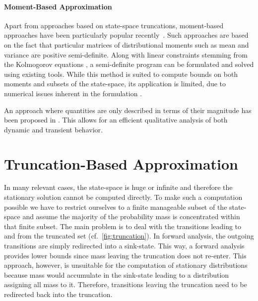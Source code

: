 \paragraph{Moment-Based Approximation}
Apart from approaches based on state-space truncations, moment-based approaches have been particularly popular recently~\parencite{ghusinga2017exact,dowdy2018bounds,kuntz2017rigorous,sakurai2017convex}.
Such approaches are based on the fact that particular matrices of distributional moments such as mean and variance are positive semi-definite.
Along with linear constraints stemming from the Kolmogorov equations \parencite{backenkohler2016generalized}, a semi-definite program can be formulated and solved using existing tools.
While this method is suited to compute bounds on both moments and subsets of the state-space, its application is limited, due to numerical issues inherent in the formulation \parencite{dowdy2018bounds}.

An approach where quantities are only described in terms of their magnitude has been proposed in \citet{ceska2019semi}. This allows for an efficient qualitative analysis of both dynamic and transient behavior.




\section{Truncation-Based Approximation}\label{sec:statagg:fsp}
In many relevant cases, the state-space is huge or infinite and therefore the stationary solution cannot be computed directly.
To make such a computation possible we have to restrict ourselves to a finite manageable subset of the state-space and assume the majority of the probability mass is concentrated within that finite subset.
The main problem is to deal with the transitions leading to and from the truncated set (cf.\ \autoref{fig:truncation}).
In forward analysis, the outgoing transitions are simply redirected into a sink-state.
This way, a forward analysis provides lower bounds since mass leaving the truncation does not re-enter.
This approach, however, is unsuitable for the computation of stationary distributions because mass would accumulate in the sink-state leading to a distribution assigning all mass to it.
Therefore, transitions leaving the truncation need to be redirected back into the truncation.

